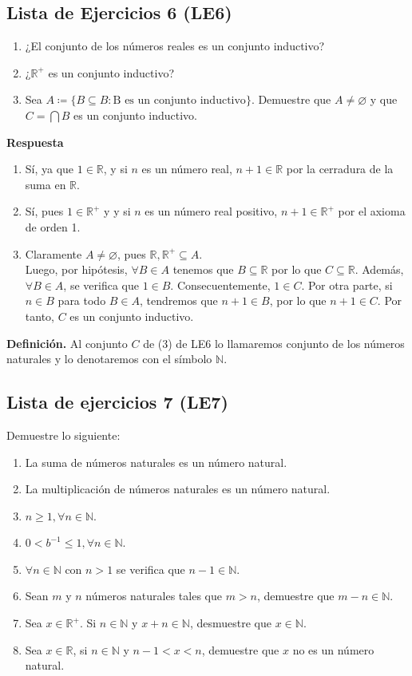 \documentclass[11pt]{article}
\newcommand{\N}{\mathbb{N}}
\newcommand{\R}{\mathbb{R}}
\let\emptyset\varnothing
\begin{document}
\subsection*{Lista de Ejercicios 6 (LE6)}

\begin{enumerate}[label=\arabic*)]
    \item ¿El conjunto de los números reales es un conjunto inductivo?
    \item ¿$\R^+$ es un conjunto inductivo?
    \item Sea $A\coloneqq \{B \subseteq B: \text{B es un conjunto inductivo}\}$. Demuestre que $A\neq \emptyset$ y que $C=\bigcap B$ es un conjunto inductivo.
\end{enumerate}

\pagebreak

\textbf{Respuesta}

\begin{enumerate}[label=\arabic*)]
    \item Sí, ya que $1 \in \R$, y si $n$ es un número real, $n+1 \in \R$ por la cerradura de la suma en $\R$.
    \item Sí, pues $1\in \R^+$ y y si $n$ es un número real positivo, $n+1 \in \R^+$ por el axioma de orden 1.
    \item Claramente $A \neq \emptyset$, pues $\R, \R^+ \subseteq A$. \\[5pt]Luego, por hipótesis, $\forall B \in A$ tenemos que $B\subseteq \R $ por lo que $C\subseteq \R$. Además, $\forall B\in A$, se verifica que $1\in B$. Consecuentemente, $1\in C$. Por otra parte, si $n\in B$ para todo $B\in A$, tendremos que $n+1\in B$, por lo que $n+1 \in C$. Por tanto, $C$ es un conjunto inductivo.
\end{enumerate}

\textbf{Definición.} Al conjunto $C$ de (3) de LE6 lo llamaremos conjunto de los números naturales y lo denotaremos con el símbolo $\N$.

\subsection*{Lista de ejercicios 7 (LE7)}

Demuestre lo siguiente:

\begin{enumerate}[label=\alph*)]
    \item La suma de números naturales es un número natural.
    \item La multiplicación de números naturales es un número natural.
    \item $n\geq 1, \forall n\in \N$.
    \item $0<b^{-1}\leq 1, \forall n\in \N$.
    \item $\forall n\in \N$ con $n>1$ se verifica que $n-1\in \N$.
    \item Sean $m$ y $n$ números naturales tales que $m>n$, demuestre que $m-n\in\N$.
    \item Sea $x\in \R^+$. Si $n\in \N$ y $x+n\in \N$, desmuestre que $x\in \N$.
    \item Sea $x\in \R$, si $n\in \N$ y $n-1<x<n$, demuestre que $x$ no es un número natural.
\end{enumerate}
\end{document}
